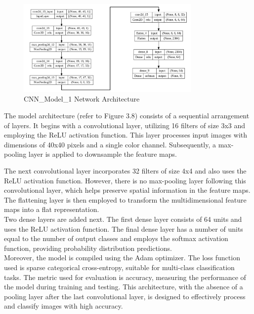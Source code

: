 \begin{figure}[h!]
    \centering
    \includegraphics[width=0.8\textwidth]{Images/Perf_Eval/NN_Architecture.png}
    \caption{CNN\_Model\_1 Network Architecture}
\end{figure}

\noindent The model architecture (refer to Figure 3.8) consists of a sequential arrangement of layers. It begins with a convolutional layer, utilizing 16 filters of size 3x3 and employing the ReLU activation function. This layer processes input images with dimensions of 40x40 pixels and a single color channel. Subsequently, a max-pooling layer is applied to downsample the feature maps.

\clearpage

\noindent The next convolutional layer incorporates 32 filters of size 4x4 and also uses the ReLU activation function. However, there is no max-pooling layer following this convolutional layer, which helps preserve spatial information in the feature maps. The flattening layer is then employed to transform the multidimensional feature maps into a flat representation.\\

\noindent Two dense layers are added next. The first dense layer consists of 64 units and uses the ReLU activation function. The final dense layer has a number of units equal to the number of output classes and employs the softmax activation function, providing probability distribution predictions.\\

\noindent Moreover, the model is compiled using the Adam optimizer. The loss function used is sparse categorical cross-entropy, suitable for multi-class classification tasks. The metric used for evaluation is accuracy, measuring the performance of the model during training and testing. This architecture, with the absence of a pooling layer after the last convolutional layer, is designed to effectively process and classify images with high accuracy.\\

